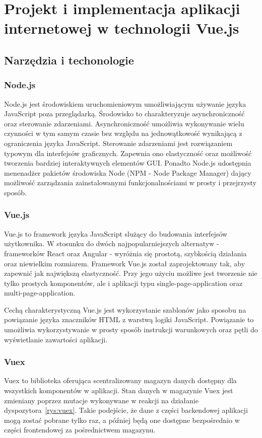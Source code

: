 
\chapter{Projekt i implementacja aplikacji internetowej w technologii Vue.js}
\section{Narzędzia i techonologie}
\subsection{Node.js}
Node.js jest środowiskiem uruchomieniowym umożliwiającym używanie języka JavaScript poza przeglądarką. Środowisko to charakteryzuje asynchroniczność oraz sterowanie zdarzeniami. Asynchroniczność umożliwia wykonywanie wielu czynności w tym samym czasie bez względu na jednowątkowość wynikającą z ograniczenia języka JavaScript. Sterowanie zdarzeniami jest rozwiązaniem typowym dla interfejsów graficznych. Zapewnia ono elastyczność oraz możliwość tworzenia bardziej interaktywnych elementów GUI. Ponadto Node.js udostępnia menenadżer pakietów środowiska Node (NPM - Node Package Manager) dający możliwość zarządzania zainstalowanymi funkcjonalnościami w prosty i przejrzysty sposób.
\subsection{Vue.js}
Vue.js to framework języka JavaScript slużący do budowania interfejsów użytkownika. W stosunku do dwóch najpopularniejszych alternatyw - frameworków React oraz Angular - wyróżnia się prostotą, szybkością działania oraz niewielkim rozmiarem. Framework Vue.js został zaprojektowany tak, aby zapewnić jak największą elastyczność. Przy jego użyciu możliwe jest tworzenie nie tylko prostych komponentów, ale i aplikacji typu single-page-application oraz multi-page-application. 

Cechą charakterystyczną Vue.js jest wykorzystanie szablonów jako sposobu na powiązanie języka znaczników HTML z warstwą logiki JavaScript. Powiązanie to umożliwia wykorzystywanie w prosty sposób instrukcji warunkowych oraz pętli do wyświetlanie zawartości aplikacji.   

\subsection{Vuex}
Vuex to biblioteka oferująca scentralizowany magazyn danych dostępny dla wszystkich komponentów w aplikacji. Stan danych w magazynie Vuex jest zmieniany poprzez mutacje wykonywane w reakcji na działanie dyspozytora~\ref{rys:vuex}. Takie podejście, że dane z części backendowej aplikacji mogą zostać pobrane tylko raz, a później będą one dostępne bezpośrednio w części frontendowej za pośrednictwem magazynu.

